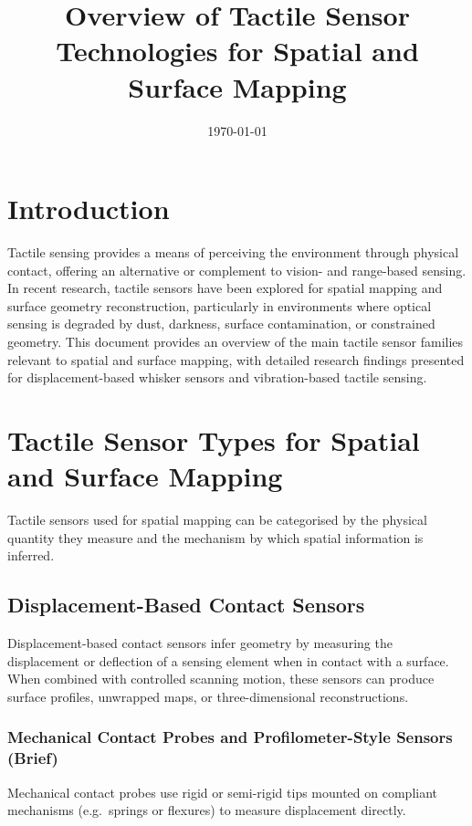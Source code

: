\documentclass[11pt,a4paper]{article}
\title{\textbf{Overview of Tactile Sensor Technologies for Spatial and Surface Mapping}}
\author{}
\date{\today}
\begin{document}
\maketitle

\section{Introduction}

Tactile sensing provides a means of perceiving the environment through physical contact, offering an alternative or complement to vision- and range-based sensing. In recent research, tactile sensors have been explored for spatial mapping and surface geometry reconstruction, particularly in environments where optical sensing is degraded by dust, darkness, surface contamination, or constrained geometry. This document provides an overview of the main tactile sensor families relevant to spatial and surface mapping, with detailed research findings presented for displacement-based whisker sensors and vibration-based tactile sensing.

\section{Tactile Sensor Types for Spatial and Surface Mapping}

Tactile sensors used for spatial mapping can be categorised by the physical quantity they measure and the mechanism by which spatial information is inferred.

\subsection{Displacement-Based Contact Sensors}

Displacement-based contact sensors infer geometry by measuring the displacement or deflection of a sensing element when in contact with a surface. When combined with controlled scanning motion, these sensors can produce surface profiles, unwrapped maps, or three-dimensional reconstructions.

\subsubsection{Mechanical Contact Probes and Profilometer-Style Sensors (Brief)}

Mechanical contact probes use rigid or semi-rigid tips mounted on compliant mechanisms (e.g.\ springs or flexures) to measure displacement directly.
\end{document}
